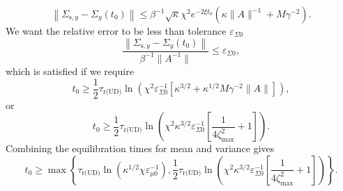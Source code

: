 \documentclass[prx,onecolumn,floatfix,longbibliography,notitlepage, nofootinbib,12pt]{revtex4-2}
\renewcommand{\geq}{\geqslant}
\renewcommand{\leq}{\leqslant}
\begin{document}
\begin{appendix}
\begin{equation}
    \left\|\Sigma_{\text{s},y} - \Sigma_{y}(t_0)\right\| \leq \beta^{-1}
   \sqrt{\kappa}\chi^2 e^{- 2\xi t_0 }\left(\kappa\|A\|^{-1}+M \gamma^{-2}\right).
\end{equation}
We want the relative error to be less than tolerance $\varepsilon_{\Sigma0}$
\begin{equation}
    \frac{\left\|\Sigma_{\text{s},y} - \Sigma_{y}(t_0)\right\|}{\beta^{-1} \|A^{-1}\|}\leq \varepsilon_{\Sigma0},
\end{equation}
which is satisfied if we require
\begin{equation}
    t_0 \geq \frac{1}{2} \tau_\text{r(UD)}\ln\left(\chi^2 \varepsilon_{\Sigma0}^{-1}\left[\kappa^{3/2}+\kappa^{1/2}M \gamma^{-2} \|A\|\right]\right),
\end{equation}
or
\begin{equation}
    t_0 \geq \frac{1}{2} \tau_\text{r(UD)}\ln\left(\chi^2 \kappa^{3/2}\varepsilon_{\Sigma0}^{-1}\left[\frac{1}{4\zeta_\text{max}^{2}}+1\right]\right).
\end{equation}
Combining the equilibration times for mean and variance gives
\begin{equation}
t_0 \geq \max \left\{ \tau_{\text{r(UD)}} \ln \left( \kappa^{1/2}\chi \varepsilon_{\mu 0}^{-1}\right),\frac{1}{2} \tau_\text{r(UD)}\ln\left(\chi^2 \kappa^{3/2}\varepsilon_{\Sigma0}^{-1}\left[\frac{1}{4\zeta_\text{max}^{2}}+1\right]\right)\right\}.
\end{equation}


\end{appendix}
\end{document}

